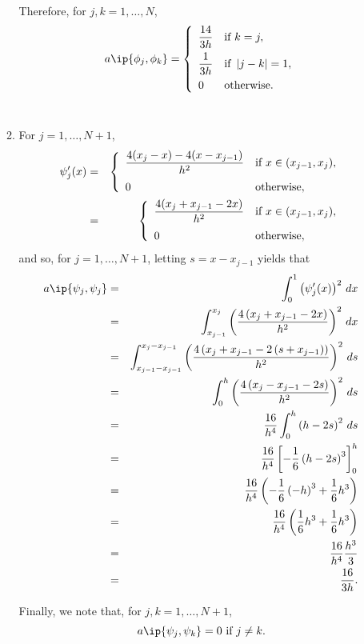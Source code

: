 \begin{solution}
\begin{enumerate}
\begin{enumerate}
Therefore, for $j,k=1,\ldots,N$,
\[
a\ip{\phi_j,\phi_k}=\left\{\begin{array}{ll}\displaystyle{{14 \over 3h}} & \mbox{if }k=j, \\[.75em] \displaystyle{{1 \over 3h}} & \mbox{if }\left|j-k\right|=1, \\[.75em] \displaystyle{0} & \mbox{otherwise}.\end{array}\right.
\]
\\
\item For $j=1,\ldots,N+1$,
\begin{eqnarray*}
\psi_j'(x)&=&\left\{\begin{array}{ll}
\displaystyle{{4(x_j-x)-4(x-x_{j-1}) \over h^2}} & \displaystyle{\mbox{if }x\in(x_{j-1},x_j)},
\\[10pt]
0 & \mbox{otherwise},
\end{array}\right.
\\
&=&\left\{\begin{array}{ll}
\displaystyle{{4(x_j+x_{j-1}-2x) \over h^2}} & \displaystyle{\mbox{if }x\in(x_{j-1},x_j)},
\\[10pt]
0 & \mbox{otherwise},
\end{array}\right.
\end{eqnarray*}
and so, for $j=1,\ldots,N+1$, letting $s=x-x_{j-1}$ yields that
\begin{eqnarray*}
a\ip{\psi_j,\psi_j}&=&\int_0^1\left(\psi_j'(x)\right)^2\,dx
\\
&=&\int_{x_{j-1}}^{x_j}\left({4\left(x_j+x_{j-1}-2x\right) \over h^2}\right)^2\,dx
\\
&=&\int_{x_{j-1}-x_{j-1}}^{x_j-x_{j-1}}\left({4\left(x_j+x_{j-1}-2\left(s+x_{j-1}\right)\right) \over h^2}\right)^2\,ds
\\
&=&\int_0^h\left({4\left(x_j-x_{j-1}-2s\right) \over h^2}\right)^2\,ds
\\
&=&{16 \over h^4}\int_0^h\left(h-2s\right)^2\,ds
\\
&=&{16 \over h^4}\left[-{1 \over 6}\left(h-2s\right)^3\right]_0^h
\\
&=&{16 \over h^4}\left(-{1 \over 6}\left(-h\right)^3+{1 \over 6}h^3\right)
\\
&=&{16 \over h^4}\left({1 \over 6}h^3+{1 \over 6}h^3\right)
\\
&=&{16 \over h^4}{h^3 \over 3}
\\
&=&{16 \over 3h}.
\end{eqnarray*}

Finally, we note that, for $j,k=1,\ldots,N+1$,
\[
a\ip{\psi_j,\psi_k}=0\mbox{ if }j\ne k.
\]


\end{enumerate}
\end{enumerate}
\end{solution}
